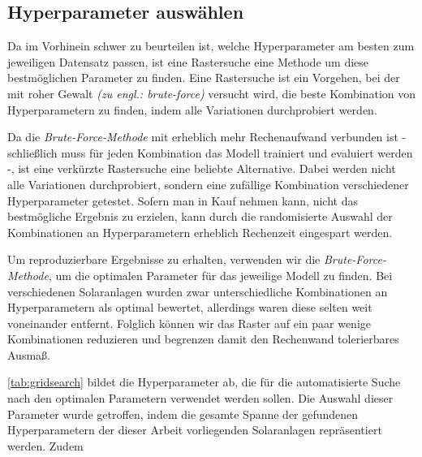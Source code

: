 \documentclass[12pt, a4paper]{article}
\begin{document}
%

\subsection{Hyperparameter auswählen}

Da im Vorhinein schwer zu beurteilen ist, welche Hyperparameter am besten zum jeweiligen Datensatz passen, ist eine Rastersuche eine Methode um diese bestmöglichen Parameter zu finden. Eine Rastersuche ist ein Vorgehen, bei der mit roher Gewalt \textit{(zu engl.: brute-force)} versucht wird, die beste Kombination von Hyperparametern zu finden, indem alle Variationen durchprobiert werden.

Da die \textit{Brute-Force-Methode} mit erheblich mehr Rechenaufwand verbunden ist - schließlich muss für jeden Kombination das Modell trainiert und evaluiert werden -, ist eine verkürzte Rastersuche eine beliebte Alternative. Dabei werden nicht alle Variationen durchprobiert, sondern eine zufällige Kombination verschiedener Hyperparameter getestet. Sofern man in Kauf nehmen kann, nicht das bestmögliche Ergebnis zu erzielen, kann durch die randomisierte Auswahl der Kombinationen an Hyperparametern erheblich Rechenzeit eingespart werden.

Um reproduzierbare Ergebnisse zu erhalten, verwenden wir die \textit{Brute-Force-Methode}, um die optimalen Parameter für das jeweilige Modell zu finden. Bei verschiedenen Solaranlagen wurden zwar unterschiedliche Kombinationen an Hyperparametern als optimal bewertet, allerdings waren diese selten weit voneinander entfernt. Folglich können wir das Raster auf ein paar wenige Kombinationen reduzieren und begrenzen damit den Rechenwand tolerierbares Ausmaß.

\autoref{tab:gridsearch} bildet die Hyperparameter ab, die für die automatisierte Suche nach den optimalen Parametern verwendet werden sollen. Die Auswahl dieser Parameter wurde getroffen, indem die gesamte Spanne der gefundenen Hyperparametern der dieser Arbeit vorliegenden Solaranlagen repräsentiert werden. Zudem 
\end{document}
